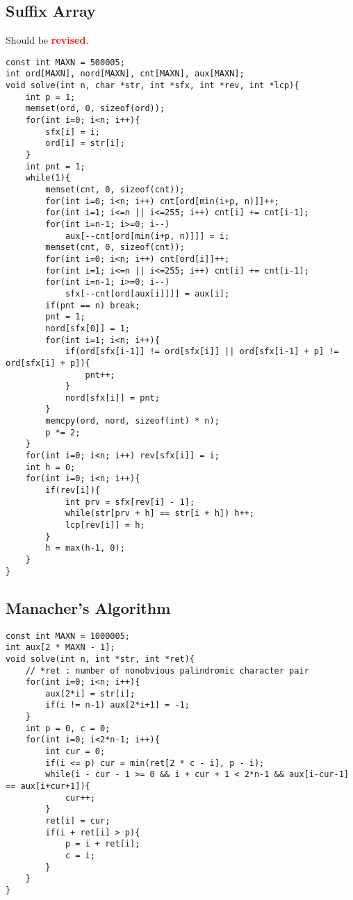 \documentclass[landscape, 8pt, a4paper, oneside, twocolumn]{extarticle}
\newcommand{\revised}{Should be \textcolor{red}{\textbf{revised}}.}
\begin{document}
\subsection{Suffix Array}
\revised %
\begin{verbatim}
const int MAXN = 500005;
int ord[MAXN], nord[MAXN], cnt[MAXN], aux[MAXN];
void solve(int n, char *str, int *sfx, int *rev, int *lcp){
	int p = 1;
	memset(ord, 0, sizeof(ord));
	for(int i=0; i<n; i++){
		sfx[i] = i;
		ord[i] = str[i];
	}
	int pnt = 1;
	while(1){
		memset(cnt, 0, sizeof(cnt));
		for(int i=0; i<n; i++) cnt[ord[min(i+p, n)]]++;
		for(int i=1; i<=n || i<=255; i++) cnt[i] += cnt[i-1];
		for(int i=n-1; i>=0; i--)
			aux[--cnt[ord[min(i+p, n)]]] = i;
		memset(cnt, 0, sizeof(cnt));
		for(int i=0; i<n; i++) cnt[ord[i]]++;
		for(int i=1; i<=n || i<=255; i++) cnt[i] += cnt[i-1];
		for(int i=n-1; i>=0; i--)
			sfx[--cnt[ord[aux[i]]]] = aux[i];
		if(pnt == n) break;
		pnt = 1;
		nord[sfx[0]] = 1;
		for(int i=1; i<n; i++){
			if(ord[sfx[i-1]] != ord[sfx[i]] || ord[sfx[i-1] + p] != ord[sfx[i] + p]){
				pnt++;
			}
			nord[sfx[i]] = pnt;
		}
		memcpy(ord, nord, sizeof(int) * n);
		p *= 2;
	}
	for(int i=0; i<n; i++) rev[sfx[i]] = i;
	int h = 0;
	for(int i=0; i<n; i++){
		if(rev[i]){
			int prv = sfx[rev[i] - 1];
			while(str[prv + h] == str[i + h]) h++;
			lcp[rev[i]] = h;
		}
		h = max(h-1, 0);
	}
}
\end{verbatim}
\subsection{Manacher's Algorithm}
\begin{verbatim}
const int MAXN = 1000005;
int aux[2 * MAXN - 1];
void solve(int n, int *str, int *ret){
	// *ret : number of nonobvious palindromic character pair
	for(int i=0; i<n; i++){
		aux[2*i] = str[i];
		if(i != n-1) aux[2*i+1] = -1;
	}
	int p = 0, c = 0;
	for(int i=0; i<2*n-1; i++){
		int cur = 0;
		if(i <= p) cur = min(ret[2 * c - i], p - i);
		while(i - cur - 1 >= 0 && i + cur + 1 < 2*n-1 && aux[i-cur-1] == aux[i+cur+1]){
			cur++;
		}
		ret[i] = cur;
		if(i + ret[i] > p){
			p = i + ret[i];
			c = i;
		}
	}
}
\end{verbatim}
\end{document}
